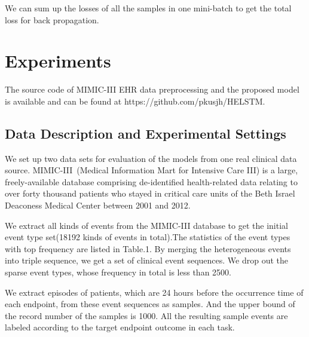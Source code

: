 \documentclass[letterpaper]{article} %
\begin{document}
We can sum up the losses of all the samples in one mini-batch to get the total loss for back propagation.


\section{Experiments}
The source code of MIMIC-III EHR data preprocessing and the proposed model is available and can be found at https://github.com/pkusjh/HELSTM.

\subsection{Data Description and Experimental Settings}
We set up two data sets for evaluation of the models from one real clinical data source. MIMIC-III~\cite{johnson2016mimic}(Medical Information Mart for Intensive Care III) is a large, freely-available database comprising de-identified health-related data relating to over forty thousand patients who stayed in critical care units of the Beth Israel Deaconess Medical Center between 2001 and 2012.

We extract all kinds of events from the MIMIC-III database to get the initial event type  set(18192 kinds of events in total).The statistics of the event types with top frequency are listed in Table.1. By merging the heterogeneous events into triple sequence, we get a set of clinical event sequences. We drop out the sparse event types, whose frequency in total is less than 2500.

 We extract episodes of patients, which are 24 hours before the occurrence time of each endpoint, from these event sequences as samples. And the upper bound of the record number of the samples is 1000. All the resulting sample events are labeled according to the target endpoint outcome in each task.
\end{document}
